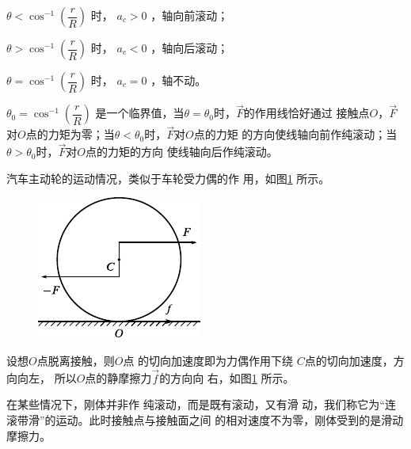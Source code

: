 $ \theta < \cos ^ { - 1 } \left( \dfrac { r } { R } \right) $ 时， $ a _ { c } > 0 $  ，轴向前滚动；

$ \theta > \cos ^ { - 1 } \left( \dfrac { r } { R } \right) $
时， $ a _ { c } < 0 $  ，轴向后滚动；

$ \theta = \cos ^ { - 1 } \left( \dfrac { r } { R } \right) $
时， $ a _ { c } = 0 $  ，轴不动。

$ \theta _ { 0 } = \cos ^ { - 1 } \left( \dfrac { r } { R } \right) $
是一个临界值，当$ \theta = \theta_{ 0 } $时，$ \vec{F} $的作用线恰好通过
接触点$ O $，$\vec{F}$对$ O $点的力矩为零；当$ \theta < \theta_{ 0 } $时，$ \vec{F} $对$ O $点的力矩
的方向使线轴向前作纯滚动；当$  \theta > \theta _ { 0 }   $时，$\vec{F}$对$ O $点的力矩的方向
使线轴向后作纯滚动。

\example 汽车主动轮的运动情况，类似于车轮受力偶的作
用，如图\ref{fig:10.20} 所示。

\begin{figure}
    \vspace{-1.56em}
    \centering
    \includegraphics{figure/fig10.20}
    \caption{}
    \label{fig:10.20}
\end{figure}
设想$ O $点脱离接触，则$ O $点
的切向加速度即为力偶作用下绕
$ C $点的切向加速度，方向向左，
所以$ O $点的静摩擦力$\vec{f}$的方向向
右，如图\ref{fig:10.20} 所示。

在某些情况下，刚体并非作
纯滚动，而是既有滚动，又有滑
动，我们称它为“连滚带滑”的运动。此时接触点与接触面之间
的相对速度不为零，刚体受到的是滑动摩擦力。
